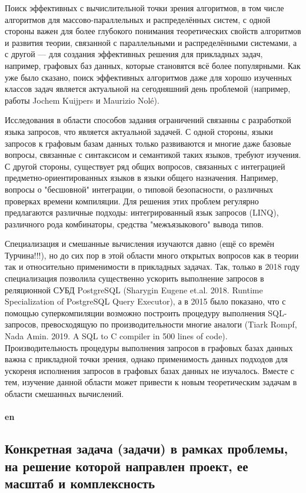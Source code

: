 \documentclass[12pt]{article}  %
\theoremstyle{remark}
\begin{document}
Поиск эффективных с вычислительной точки зрения алгоритмов, в том числе алгоритмов для массово-параллельных и распределённых систем, с одной стороны важен для более глубокого понимания теоретических свойств алгоритмов и развития теории, связанной с параллельными и распределёнными системами, а с другой --- для создания эффективных решения для прикладных задач, например, графовых баз данных, которые становятся всё более популярными. Как уже было сказано, поиск эффективных алгоритмов даже для хорошо изученных классов задач является актуальной на сегодняшний день проблемой (например, работы Jochem Kuijpers и Maurizio Nolé).

Исследования в области способов задания ограничений связанны с разработкой языка запросов, что является актуальной задачей. С одной стороны, языки запросов к графовым базам данных только развиваются и многие даже базовые вопросы, связанные с синтаксисом и семантикой таких языков, требуют изучения. С другой стороны, существует ряд общих вопросов, связанных с интеграцией предметно-ориентированных языков в языки общего назначения. Например, вопросы о "бесшовной" интеграции, о типовой безопасности, о различных проверках времени компиляции. Для решения этих проблем регулярно предлагаются различные подходы: интегрированный язык запросов (LINQ), различного рода комбинаторы, средства "межъязыкового" вывода типов.

Специализация и смешанные вычисления изучаются давно (ещё со времён Турчина!!!), но до сих пор в этой области много открытых вопросов как в теории так и относительно применимости в прикладных задачах. Так, только в 2018 году специализация позволила существенно ускорить выполнение запросов в реляционной СУБД PostgreSQL (Sharygin Eugene et.al. 2018. Runtime Specialization of PostgreSQL Query Executor), а в 2015 было показано, что с помощью суперкомпиляции возможно построить процедуру выполнения SQL-запросов, превосходящую по производительности многие аналоги (Tiark Rompf, Nada Amin. 2019. A SQL to C compiler in 500 lines of code). Производительность процедуры выполнения запросов в графовых базах данных важна с прикладной точки зрения, однако применимость данных подходов для ускореня исполнения запросов в графовых базах данных не изучалось. Вместе с тем, изучение данной области может привести к новым теоретическим задачам в области смешанных вычислений.
\\
\\
\textbf{en}\\


\subsection{Конкретная задача (задачи) в рамках проблемы, на решение которой направлен проект, ее масштаб и комплексность}
\end{document}

